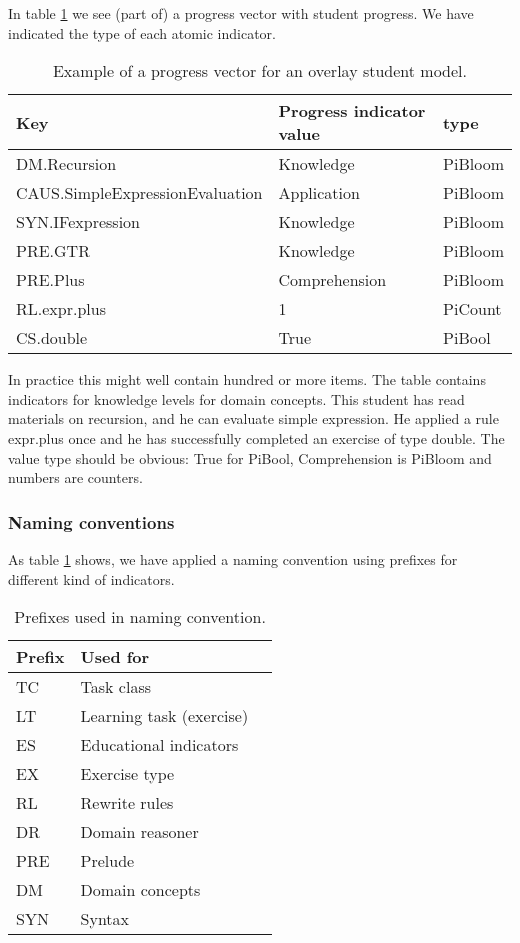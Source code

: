 In  table \ref{student.progressvec1} we see (part of) a progress vector with student progress.
We have indicated the type of each atomic indicator.

\begin{table}[H]
\begin{tabular}{| l | l | l |}
\hline
Key & Progress indicator value & type\\
\hline
DM.Recursion & Knowledge & PiBloom \\
CAUS.SimpleExpressionEvaluation & Application & PiBloom\\
SYN.IFexpression & Knowledge  & PiBloom\\
PRE.GTR & Knowledge  &PiBloom\\
PRE.Plus & Comprehension  & PiBloom\\
RL.expr.plus& 1 & PiCount\\
CS.double& True & PiBool\\
\hline
\end{tabular}
\caption{Example of a progress vector for an overlay student model.}
\label{student.progressvec1}
\end{table}
 
In practice this might well contain hundred or more items.
The table contains indicators for knowledge levels for domain concepts.
This student has read materials on recursion, and he can evaluate simple expression.
He applied a rule expr.plus once and he has successfully completed an exercise of type double.
The value type should be obvious: True for PiBool, Comprehension is PiBloom and numbers are counters.

\subsubsection{Naming conventions}
As table \ref{student.progressvec1} shows, we have applied a naming convention using prefixes for different kind of indicators.

\begin{table}[H]
\begin{tabular}{| l | l | l |}
\hline
Prefix & Used for\\
\hline
TC & Task class\\
LT & Learning task (exercise)\\
ES & Educational indicators \\
EX & Exercise type \\ 
RL & Rewrite rules\\
DR & Domain reasoner\\
PRE & Prelude \\
DM & Domain concepts \\
SYN & Syntax\\
\hline
\end{tabular}
\caption{Prefixes used in naming convention.}
\label{student.namingConvention}
\end{table}

